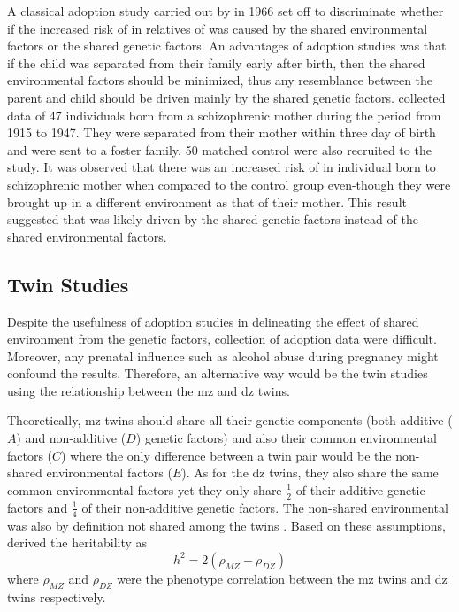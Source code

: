 	A classical adoption study carried out by \citet{HESTON1966} in 1966 set off to discriminate whether if the increased risk of  in relatives of  was caused by the shared environmental factors or the shared genetic factors. 
	An advantages of adoption studies was that if the child was separated from their family early after birth, then the shared environmental factors should be minimized, thus any resemblance between the parent and child should be driven mainly by the shared genetic factors.
	\citet{HESTON1966} collected data of 47 individuals born from a schizophrenic mother during the period from 1915 to 1947. 
	They were separated from their mother within three day of birth and were sent to a foster family. 
	50 matched control were also recruited to the study.
	It was observed that there was an increased risk of  in individual born to schizophrenic mother when compared to the control group even-though they were brought up in a different environment as that of their mother.
	This result suggested that  was likely driven by the shared genetic factors instead of the shared environmental factors.
	
	\subsection{Twin Studies}
	Despite the usefulness of adoption studies in delineating the effect of shared environment from the genetic factors, collection of adoption data were difficult. 
	Moreover, any prenatal influence such as alcohol abuse during pregnancy might confound the results.
	Therefore, an alternative way would be the twin studies using the relationship between the \gls{mz} and \gls{dz} twins.
	
	Theoretically, \gls{mz} twins should share all their genetic components (both additive ($A$) and non-additive ($D$) genetic factors) and also their common environmental factors ($C$) where the only difference between a twin pair would be the non-shared environmental factors ($E$). 
	As for the \gls{dz} twins, they also share the same common environmental factors yet they only share $\frac{1}{2}$ of their additive genetic factors and $\frac{1}{4}$ of their non-additive genetic factors. 
	The non-shared environmental was also by definition not shared among the twins \citep{Rijsdijk2002}.
	Based on these assumptions, \cite{Falconer1996} derived the heritability as
	\begin{equation}
	h^2 = 2(\rho_{MZ}-\rho_{DZ})
	\end{equation}
	where $\rho_{MZ}$ and $\rho_{DZ}$ were the phenotype correlation between the \gls{mz} twins and \gls{dz} twins respectively.
	
